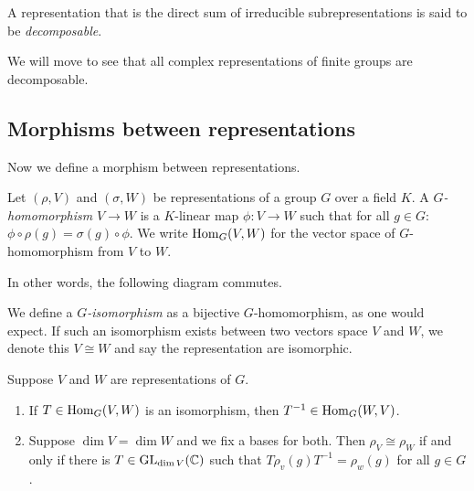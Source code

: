 \begin{definition}[Decomposable]
  A representation that is the direct sum of irreducible subrepresentations is said to be \emph{decomposable}.
\end{definition}

We will move to see that all complex representations of finite groups are decomposable.

\subsection{Morphisms between representations}

Now we define a morphism between representations.

\begin{definition}
  Let $(\rho, V)$ and $(\sigma, W)$ be representations of a group $G$ over a field $K$. A \emph{$G$-homomorphism} $V \to W$ is a $K$-linear map $\phi: V \to W$ such that for all $g \in G$: $\phi \circ \rho(g) = \sigma(g) \circ \phi$. We write $\operatorname{Hom}_G(V,W)$ for the vector space of $G$-homomorphism from $V$ to $W$.
\end{definition}

In other words, the following diagram commutes.

\begin{center}
\end{center}

We define a \emph{$G$-isomorphism} as a bijective $G$-homomorphism, as one would expect. If such an isomorphism exists between two vectors space $V$ and $W$, we denote this $V \cong W$ and say the representation are isomorphic.

\begin{lemma}
  Suppose $V$ and $W$ are representations of $G$.
  \begin{enumerate}
    \item If $T \in \operatorname{Hom}_G(V,W)$ is an isomorphism, then $T^{-1} \in \operatorname{Hom}_G(W,V)$.
    \item Suppose $\dim V = \dim W$ and we fix a bases for both. Then $\rho_V \cong \rho_W$ if and only if there is $T \in \operatorname{GL}_{\dim V}(\mathbb C)$ such that $T \rho_v(g) T^{-1} = \rho_w(g)$ for all $g \in G$.
  \end{enumerate}
\end{lemma}

